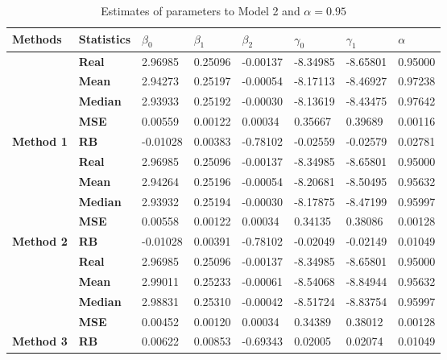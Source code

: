 \begin{table}

\caption{\label{tab:Est_model_2_Alpha0.95}Estimates of parameters to Model 2 and $\alpha=0.95$}
\centering
\begin{tabular}[t]{>{}l>{}lllllll}
\toprule
Methods & Statistics & $\beta_0$ & $\beta_1$ & $\beta_2$ & $\gamma_0$ & $\gamma_1$ & $\alpha$\\
\midrule
 & \textbf{Real} & 2.96985 & 0.25096 & -0.00137 & -8.34985 & -8.65801 & 0.95000\\
\cmidrule{2-8}
 & \textbf{Mean} & 2.94273 & 0.25197 & -0.00054 & -8.17113 & -8.46927 & 0.97238\\
\cmidrule{2-8}
 & \textbf{Median} & 2.93933 & 0.25192 & -0.00030 & -8.13619 & -8.43475 & 0.97642\\
\cmidrule{2-8}
 & \textbf{MSE} & 0.00559 & 0.00122 & 0.00034 & 0.35667 & 0.39689 & 0.00116\\
\cmidrule{2-8}
\multirow{-5}{*}{\raggedright\arraybackslash \textbf{Method 1}} & \textbf{RB} & -0.01028 & 0.00383 & -0.78102 & -0.02559 & -0.02579 & 0.02781\\
\cmidrule{1-8}
 & \textbf{Real} & 2.96985 & 0.25096 & -0.00137 & -8.34985 & -8.65801 & 0.95000\\
\cmidrule{2-8}
 & \textbf{Mean} & 2.94264 & 0.25196 & -0.00054 & -8.20681 & -8.50495 & 0.95632\\
\cmidrule{2-8}
 & \textbf{Median} & 2.93932 & 0.25194 & -0.00030 & -8.17875 & -8.47199 & 0.95997\\
\cmidrule{2-8}
 & \textbf{MSE} & 0.00558 & 0.00122 & 0.00034 & 0.34135 & 0.38086 & 0.00128\\
\cmidrule{2-8}
\multirow{-5}{*}{\raggedright\arraybackslash \textbf{Method 2}} & \textbf{RB} & -0.01028 & 0.00391 & -0.78102 & -0.02049 & -0.02149 & 0.01049\\
\cmidrule{1-8}
 & \textbf{Real} & 2.96985 & 0.25096 & -0.00137 & -8.34985 & -8.65801 & 0.95000\\
\cmidrule{2-8}
 & \textbf{Mean} & 2.99011 & 0.25233 & -0.00061 & -8.54068 & -8.84944 & 0.95632\\
\cmidrule{2-8}
 & \textbf{Median} & 2.98831 & 0.25310 & -0.00042 & -8.51724 & -8.83754 & 0.95997\\
\cmidrule{2-8}
 & \textbf{MSE} & 0.00452 & 0.00120 & 0.00034 & 0.34389 & 0.38012 & 0.00128\\
\cmidrule{2-8}
\multirow{-5}{*}{\raggedright\arraybackslash \textbf{Method 3}} & \textbf{RB} & 0.00622 & 0.00853 & -0.69343 & 0.02005 & 0.02074 & 0.01049\\
\bottomrule
\end{tabular}
\end{table}
